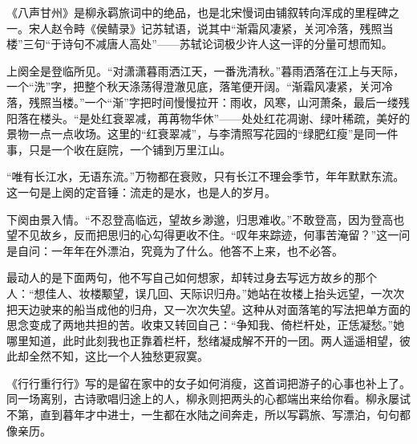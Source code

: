 \begin{appreciation}
《八声甘州》是柳永羁旅词中的绝品，也是北宋慢词由铺叙转向浑成的里程碑之一。宋人赵令畤《侯鲭录》记苏轼语，说其中“渐霜风凄紧，关河冷落，残照当楼”三句“于诗句不减唐人高处”——苏轼论词极少许人这一评的分量可想而知。

上阕全是登临所见。“对潇潇暮雨洒江天，一番洗清秋。”暮雨洒落在江上与天际，一个“洗”字，把整个秋天涤荡得澄澈见底，落笔便开阔。“渐霜风凄紧，关河冷落，残照当楼。”一个“渐”字把时间慢慢拉开：雨收，风寒，山河萧条，最后一缕残阳落在楼头。“是处红衰翠减，苒苒物华休”——处处红花凋谢、绿叶稀疏，美好的景物一点一点收场。这里的“红衰翠减”，与李清照写花园的“绿肥红瘦”是同一件事，只是一个收在庭院，一个铺到万里江山。

“唯有长江水，无语东流。”万物都在衰败，只有长江不理会季节，年年默默东流。这一句是上阕的定音锤：流走的是水，也是人的岁月。

下阕由景入情。“不忍登高临远，望故乡渺邈，归思难收。”不敢登高，因为登高也望不见故乡，反而把思归的心勾得更收不住。“叹年来踪迹，何事苦淹留？”这一问是自问：一年年在外漂泊，究竟为了什么。他答不上来，也不必答。

最动人的是下面两句，他不写自己如何想家，却转过身去写远方故乡的那个人：“想佳人、妆楼颙望，误几回、天际识归舟。”她站在妆楼上抬头远望，一次次把天边驶来的船当成他的归舟，又一次次失望。这种从对面落笔的写法把单方面的思念变成了两地共担的苦。收束又转回自己：“争知我、倚栏杆处，正恁凝愁。”她哪里知道，此时此刻我也正靠着栏杆，愁绪凝成解不开的一团。两人遥遥相望，彼此却全然不知，这比一个人独愁更寂寞。

《行行重行行》写的是留在家中的女子如何消瘦，这首词把游子的心事也补上了。同一场离别，古诗歌唱归途上的人，柳永则把两头的心都端出来给你看。柳永屡试不第，直到暮年才中进士，一生都在水陆之间奔走，所以写羁旅、写漂泊，句句都像亲历。
\end{appreciation}

